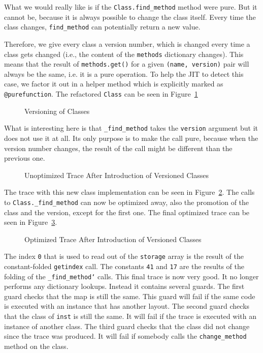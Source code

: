 \documentclass{sig-alternate}
\begin{document}
What we would really like is if the \texttt{Class.find\_method} method were pure.
But it cannot be, because it is always possible to change the class itself.
Every time the class changes, \texttt{find\_method} can potentially return a
new value.

Therefore, we give every class a version number, which is changed every time a
class gets changed (i.e., the content of the \texttt{methods} dictionary changes).
This means that the result of \texttt{methods.get()} for a given \texttt{(name,
version)} pair will always be the same, i.e. it is a pure operation.  To help
the JIT to detect this case, we factor it out in a helper method which is
explicitly marked as \texttt{@purefunction}. The refactored \texttt{Class} can
be seen in Figure~\ref{fig:version}

\begin{figure}

\caption{Versioning of Classes}
\label{fig:version}
\end{figure}

What is interesting here is that \texttt{\_find\_method} takes the \texttt{version}
argument but it does not use it at all. Its only purpose is to make the call
pure, because when the version number changes, the result of the call might be
different than the previous one.

\begin{figure}

\caption{Unoptimized Trace After Introduction of Versioned Classes}
\label{fig:trace4}
\end{figure}

The trace with this new class implementation can be seen in
Figure~\ref{fig:trace4}.
The calls to \texttt{Class.\_find\_method} can now be optimized away, also the
promotion of the class and the version, except for the first one. The final
optimized trace can be seen in Figure~\ref{fig:trace5}.

\begin{figure}

\caption{Optimized Trace After Introduction of Versioned Classes}
\label{fig:trace5}
\end{figure}

The index \texttt{0} that is used to read out of the \texttt{storage} array is the result
of the constant-folded \texttt{getindex} call.
The constants \texttt{41} and \texttt{17} are the results of the folding of the
\texttt{\_find\_method`} calls. This final trace is now very good. It no longer performs any
dictionary lookups. Instead it contains several guards. The first guard
checks that the map is still the same. This guard will fail if the same
code is executed with an instance that has another layout. The second guard
checks that the class of \texttt{inst} is still the same. It will fail if the trace is
executed with an instance of another class. The third guard checks that the
class did not change since the trace was produced. It will fail if somebody
calls the \texttt{change\_method} method on the class.
\end{document}
